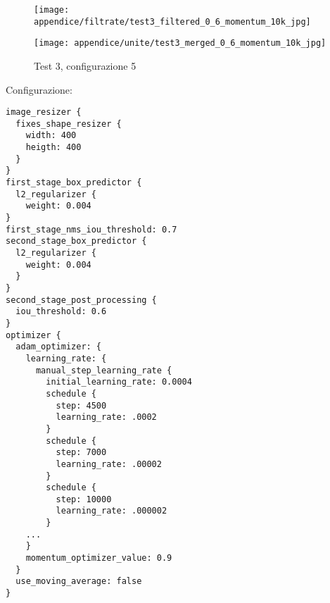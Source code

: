 \newpage
\begin{figure}[H]  
    \begin{minipage}{.5\columnwidth}  
        \centering  
        \texttt{[image: appendice/filtrate/test3\_filtered\_0\_6\_momentum\_10k\_jpg]}  
    \end{minipage}%
    \begin{minipage}{0.5\columnwidth}  
        \centering  
        \texttt{[image: appendice/unite/test3\_merged\_0\_6\_momentum\_10k\_jpg]}  
    \end{minipage}  
    \caption{Test 3, configurazione 5}
\end{figure}%
Configurazione:
\begin{multicols}{2}
    \begin{lstlisting}
image_resizer {
  fixes_shape_resizer {
    width: 400
    heigth: 400
  }
}
first_stage_box_predictor {
  l2_regularizer {
    weight: 0.004
}
first_stage_nms_iou_threshold: 0.7
second_stage_box_predictor {
  l2_regularizer {
    weight: 0.004
  }
}
second_stage_post_processing {
  iou_threshold: 0.6
}
optimizer {
  adam_optimizer: {
    learning_rate: {
      manual_step_learning_rate {
        initial_learning_rate: 0.0004
        schedule {
          step: 4500
          learning_rate: .0002
        }
        schedule {
          step: 7000
          learning_rate: .00002
        }
        schedule {
          step: 10000
          learning_rate: .000002
        }
    ...
    }
    momentum_optimizer_value: 0.9
  }
  use_moving_average: false
}
    \end{lstlisting}
\end{multicols}

